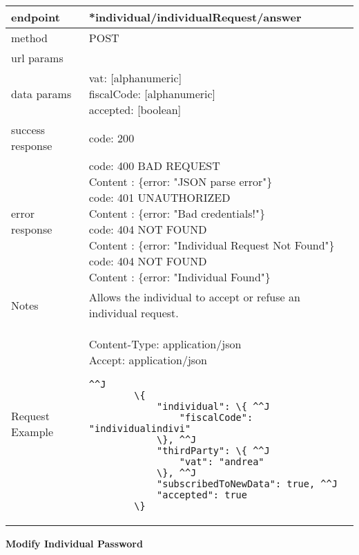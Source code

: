 	\begin{tabularx}{\linewidth}{| l| l }
		\hline
		endpoint & *individual/individualRequest/answer \\
		\hline
		method & POST \\
		\hline
		url params & \\
		\hline
		data params &
		\parbox{0.7\textwidth}{
			\bigskip
			vat: [alphanumeric]\\
			fiscalCode: [alphanumeric]\\
			accepted: [boolean]
			\bigskip
		} \\
		\hline
		success response &
		\parbox{0.7\textwidth}{
			\bigskip
			code: 200
			\bigskip
		} \\
		\hline
		error response &
		\parbox{0.7\textwidth}{
			\bigskip
			code: 400 BAD REQUEST \\
			Content : \{error: "JSON parse error"\}\\
			code: 401 UNAUTHORIZED \\
			Content : \{error: "Bad credentials!"\}\\
			code: 404 NOT FOUND \\
			Content : \{error: "Individual Request Not Found"\}\\
			code: 404 NOT FOUND \\
			Content : \{error: "Individual Found"\}
			\bigskip
		} \\
		\hline
		Notes & 
		\parbox{0.7\textwidth}{
			\bigskip Allows the individual to accept or refuse an individual request.
		\bigskip}  \\
		\hline
		Request Example & 
		\parbox{0.8\textwidth}{
		\bigskip
		Content-Type: application/json \\
		Accept: application/json \\
		\bigskip
		\begin{lstlisting}^^J
		\{
			"individual": \{ ^^J
				"fiscalCode": "individualindivi"
			\}, ^^J
			"thirdParty": \{ ^^J
				"vat": "andrea"
			\}, ^^J
			"subscribedToNewData": true, ^^J
			"accepted": true
		\}
	\end{lstlisting}
	} \\
	\hline
	\end{tabularx}
	
	\textbf{Modify Individual Password}\\

